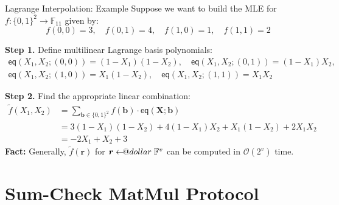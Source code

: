 \documentclass{zkdl-presentation-template}
\makeatletter
\newcommand\leftarrowS{\leftarrow\joinrel\smalldollar}
\newcommand{\smalldollar}{\mathrel{\mathpalette\small@dollar\relax}}
\newcommand{\small@dollar}[2]{%
  \vcenter{\hbox{%
    $#1\textnormal{\fontsize{0.7\dimexpr\f@size pt}{0}\selectfont\$}$%
  }}%
}
\makeatother
\begin{document}
    \begin{frame}{Lagrange Interpolation: Example}
        Suppose we want to build the MLE for $f: \{0,1\}^2 \to \mathbb{F}_{11}$ given by:
        \begin{equation*}
            f(0,0) = 3, \quad f(0,1) = 4, \quad f(1,0) = 1, \quad f(1,1) = 2
        \end{equation*}
        
        \vspace{-10px}

        \pause\textcolor{green!50!black}{\textbf{Step 1.}} Define multilinear Lagrange basis polynomials:
        \begin{gather*}
            \mathsf{eq}(X_1,X_2;(0,0)) = (1-X_1)(1-X_2), \quad \mathsf{eq}(X_1,X_2;(0,1)) = (1-X_1)X_2, \\
            \mathsf{eq}(X_1,X_2;(1,0)) = X_1(1-X_2), \quad \mathsf{eq}(X_1,X_2;(1,1)) = X_1X_2
        \end{gather*}

        \vspace{-10px}

        \pause\textcolor{blue!70!black}{\textbf{Step 2.}} Find the appropriate linear combination:
        \begin{align*}
            \widetilde{f}(X_1,X_2) &= \sum_{\boldsymbol{b} \in \{0,1\}^2} f(\boldsymbol{b}) \cdot \mathsf{eq}(\mathbf{X};\boldsymbol{b}) \\
            &= 3(1-X_1)(1-X_2) + 4(1-X_1)X_2 + X_1(1-X_2) + 2X_1X_2 \\
            &= \boxed{-2X_1 + X_2 + 3}
        \end{align*}
        \pause\textbf{Fact:} Generally, $\widetilde{f}(\boldsymbol{r})$ for
        $\boldsymbol{r} \leftarrowS \mathbb{F}^v$ can be computed in
        $\mathcal{O}(2^v)$ time.
    \end{frame}

    \section{Sum-Check MatMul Protocol}
\end{document}
